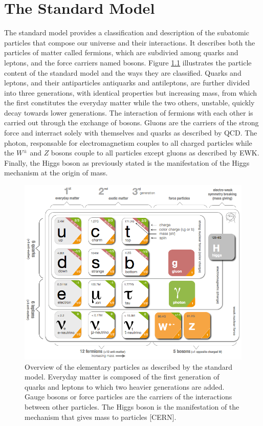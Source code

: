 \chapter{The Standard Model}
\label{chap:I-1-standard-model}

  The standard model provides a classification and description of the subatomic particles that compose our universe and their interactions. It describes both the particles of matter called fermions, which are subdivied among quarks and leptons, and the force carriers named bosons. Figure \ref{fig:I-1-sm-particles} illustrates the particle content of the standard model and the ways they are classified. Quarks and leptons, and their antiparticles antiquarks and antileptons, are further divided into three generations, with identical properties but increasing mass, from which the first constitutes the everyday matter while the two others, unstable, quickly decay towards lower generations. The interaction of fermions with each other is carried out through the exchange of bosons. Gluons are the carriers of the strong force and interract solely with themselves and quarks as described by QCD. The photon, responsable for electromagnetism couples to all charged particles while the $ W^\pm $ and $ Z $ bosons couple to all particles except gluons as described by EWK. Finally, the Higgs boson as previously stated is the manifestation of the Higgs mechanism at the origin of mass. \\

	\begin{figure}[h!]
		\centering
		\includegraphics[width = \textwidth]{img/I-1/sm-particles.png}
		\caption{Overview of the elementary particles as described by the standard model. Everyday matter is composed of the first generation of quarks and leptons to which two heavier generations are added. Gauge bosons or force particles are the carriers of the interactions between other particles. The Higgs boson is the manifestation of the mechanism that gives mass to particles [CERN].}
		\label{fig:I-1-sm-particles}
	\end{figure}

